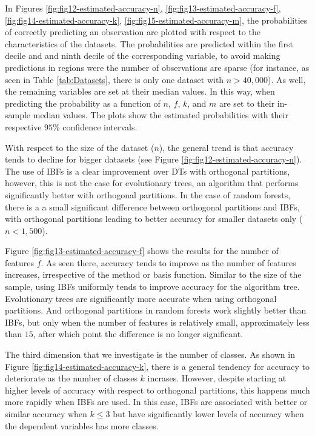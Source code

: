 \documentclass[]{elsarticle} %
\begin{document}
In Figures \ref{fig:fig12-estimated-accuracy-n},
\ref{fig:fig13-estimated-accuracy-f},
\ref{fig:fig14-estimated-accuracy-k},
\ref{fig:fig15-estimated-accuracy-m}, the probabilities of correctly
predicting an observation are plotted with respect to the
characteristics of the datasets. The probabilities are predicted within
the first decile and and ninth decile of the corresponding variable, to
avoid making predictions in regions were the number of observations are
sparse (for instance, as seen in Table \ref{tab:Datasets}, there is only
one dataset with \(n>40,000\)). As well, the remaining variables are set
at their median values. In this way, when predicting the probability as
a function of \(n\), \(f\), \(k\), and \(m\) are set to their in-sample
median values. The plots show the estimated probabilities with their
respective \(95\)\% confidence intervals.

With respect to the size of the dataset (\(n\)), the general trend is
that accuracy tends to decline for bigger datasets (see Figure
\ref{fig:fig12-estimated-accuracy-n}). The use of IBFs is a clear
improvement over DTs with orthogonal partitions, however, this is not
the case for evolutionary trees, an algorithm that performs
significantly better with orthogonal partitions. In the case of random
forests, there is a a small significant difference between orthogonal
partitions and IBFs, with orthogonal partitions leading to better
accuracy for smaller datasets only (\(n<1,500\)).

Figure \ref{fig:fig13-estimated-accuracy-f} shows the results for the
number of features \(f\). As seen there, accuracy tends to improve as
the number of features increases, irrespective of the method or basis
function. Similar to the size of the sample, using IBFs uniformly tends
to improve accuracy for the algorithm tree. Evolutionary trees are
significantly more accurate when using orthogonal partitions. And
orthogonal partitions in random forests work slightly better than IBFs,
but only when the number of features is relatively small, approximately
less than \(15\), after which point the difference is no longer
significant.

The third dimension that we investigate is the number of classes. As
shown in Figure \ref{fig:fig14-estimated-accuracy-k}, there is a general
tendency for accuracy to deteriorate as the number of classes \(k\)
incrases. However, despite starting at higher levels of accuracy with
respect to orthogonal partitions, this happens much more rapidly when
IBFs are used. In this case, IBFs are associated with better or similar
accuracy when \(k\leq3\) but have significantly lower levels of accuracy
when the dependent variables has more classes.
\end{document}

